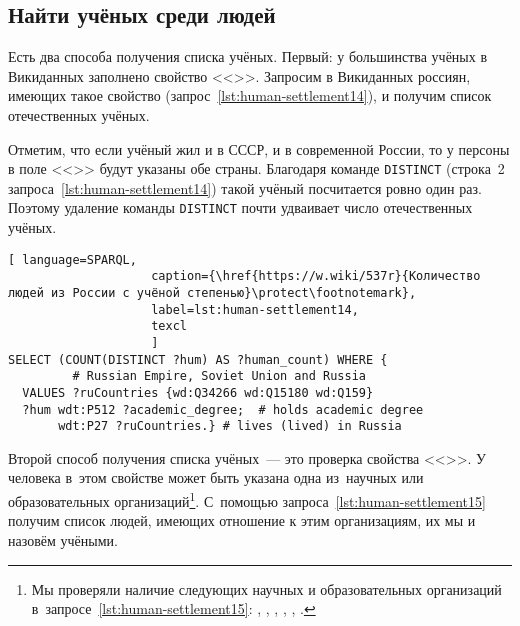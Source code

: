 \subsection{Найти учёных среди людей}

Есть два способа получения списка учёных. 
Первый: у большинства учёных в Викиданных заполнено свойство <<>>. 
Запросим в Викиданных россиян, имеющих такое свойство (запрос~\ref{lst:human-settlement14}), 
и получим список отечественных учёных. 


Отметим, что если учёный жил и в СССР, и в современной России, 
то у персоны в поле <<>> будут указаны обе страны.  
Благодаря команде \lstinline|DISTINCT| (строка~2 запроса~\ref{lst:human-settlement14}) 
такой учёный посчитается ровно один раз. 
Поэтому удаление команды \lstinline|DISTINCT| почти удваивает число отечественных учёных. 

\begin{lstlisting}[ language=SPARQL, 
                    caption={\href{https://w.wiki/537r}{Количество людей из России с учёной степенью}\protect\footnotemark},
                    label=lst:human-settlement14,
                    texcl 
                    ]
SELECT (COUNT(DISTINCT ?hum) AS ?human_count) WHERE {
         # Russian Empire, Soviet Union and Russia
  VALUES ?ruCountries {wd:Q34266 wd:Q15180 wd:Q159}
  ?hum wdt:P512 ?academic_degree;  # holds academic degree 
       wdt:P27 ?ruCountries.} # lives (lived) in Russia
\end{lstlisting}%

Второй способ получения списка учёных~--- это проверка свойства 
<<>>. 
У человека в~этом свойстве может быть указана одна из~научных или образовательных организаций\footnote{%
%
%
Мы проверяли наличие следующих научных и образовательных организаций
в~запросе~\ref{lst:human-settlement15}: 
, , 
, , 
, .%
}.  %
С~помощью запроса~\ref{lst:human-settlement15} 
получим список людей, имеющих отношение к этим организациям, 
их мы и назовём учёными. 

